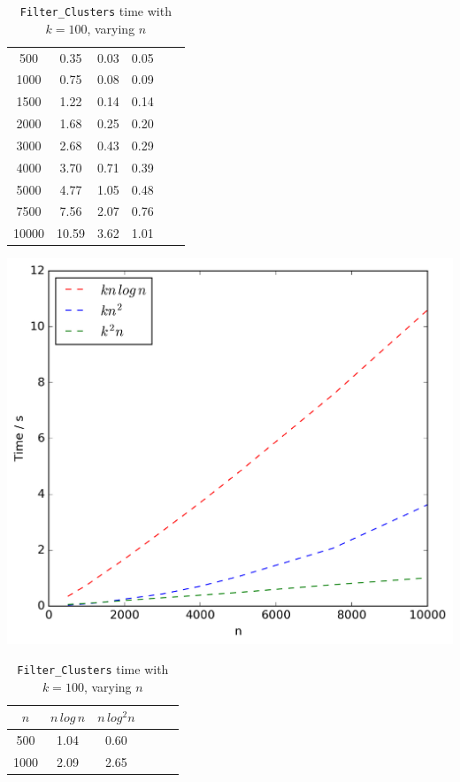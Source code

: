 \documentclass{article}
\begin{document}
\begin{table}[!ht]
\begin{minipage}{0.48\textwidth}
\begin{tabular}{c||ccccc}
                \hline\hline
                500 & 0.35 & 0.03 & 0.05\\
                1000 & 0.75 & 0.08 & 0.09\\
                1500 & 1.22 & 0.14 & 0.14\\
                2000 & 1.68 & 0.25 & 0.20\\
                3000 & 2.68 & 0.43 & 0.29\\
                4000 & 3.70 & 0.71 & 0.39\\
                5000 & 4.77 & 1.05 & 0.48\\
                7500 & 7.56 & 2.07 & 0.76\\
                10000 & 10.59 & 3.62 & 1.01\\
            \end{tabular}
            \includegraphics[scale=0.4]{varyingn2_weighting}
        \end{minipage}\hfill
        \begin{minipage}{0.48\textwidth}
            \centering
            \caption{\texttt{Filter\_Clusters} time with $k = 100$, varying $n$}
            \label{tab:filtern2}
            \begin{tabular}{c||ccccc}
                $n$ & $n\,log\,n$ & $n\,log^2n$\\
                \hline\hline
                500 & 1.04 & 0.60\\
                1000 & 2.09 & 2.65\\

\end{tabular}
\end{minipage}
\end{table}
\end{document}
